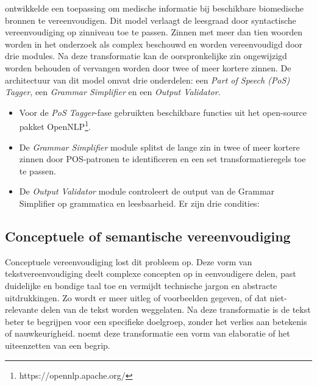 \textcite{Kandula2010} ontwikkelde een toepassing om medische informatie bij beschikbare biomedische bronnen te vereenvoudigen. Dit model verlaagt de leesgraad door syntactische vereenvoudiging op zinniveau toe te passen. Zinnen met meer dan tien woorden worden in het onderzoek als complex beschouwd en worden vereenvoudigd door drie modules. Na deze transformatie kan de oorspronkelijke zin ongewijzigd worden behouden of vervangen worden door twee of meer kortere zinnen. De architectuur van dit model omvat drie onderdelen: een \textit{Part of Speech (PoS) Tagger}, een \textit{Grammar Simplifier} en een \textit{Output Validator}. 

\begin{itemize}
	\item Voor de \textit{PoS Tagger}-fase gebruikten \textcite{Kandula2010} beschikbare functies uit het open-source pakket OpenNLP\footnote{https://opennlp.apache.org/}.
	\item De \textit{Grammar Simplifier} module splitst de lange zin in twee of meer kortere zinnen door POS-patronen te identificeren en een set transformatieregels toe te passen.
	\item De \textit{Output Validator} module controleert de output van de Grammar Simplifier op grammatica en leesbaarheid. Er zijn drie condities:
\end{itemize}  



\subsection{Conceptuele of semantische vereenvoudiging}

Conceptuele vereenvoudiging lost dit probleem op. Deze vorm van tekstvereenvoudiging deelt complexe concepten op in eenvoudigere delen, past duidelijke en bondige taal toe en vermijdt technische jargon en abstracte uitdrukkingen. Zo wordt er meer uitleg of voorbeelden gegeven, of dat niet-relevante delen van de tekst worden weggelaten. Na deze transformatie is de tekst beter te begrijpen voor een specifieke doelgroep, zonder het verlies aan betekenis of nauwkeurigheid. \textcite{Siddharthan2014} noemt deze transformatie een vorm van elaboratie of het uiteenzetten van een begrip.

